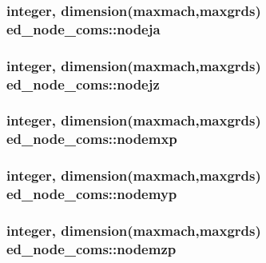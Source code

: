 \subsubsection[{\texorpdfstring{nodeja}{nodeja}}]{\setlength{\rightskip}{0pt plus 5cm}integer, dimension(maxmach,maxgrds) ed\+\_\+node\+\_\+coms\+::nodeja}\hypertarget{namespaceed__node__coms_a116c403afd361d69151547dc435f4fbb}{}\label{namespaceed__node__coms_a116c403afd361d69151547dc435f4fbb}
\subsubsection[{\texorpdfstring{nodejz}{nodejz}}]{\setlength{\rightskip}{0pt plus 5cm}integer, dimension(maxmach,maxgrds) ed\+\_\+node\+\_\+coms\+::nodejz}\hypertarget{namespaceed__node__coms_ae1f44d8dd2031c7740623b475928d5f2}{}\label{namespaceed__node__coms_ae1f44d8dd2031c7740623b475928d5f2}
\subsubsection[{\texorpdfstring{nodemxp}{nodemxp}}]{\setlength{\rightskip}{0pt plus 5cm}integer, dimension(maxmach,maxgrds) ed\+\_\+node\+\_\+coms\+::nodemxp}\hypertarget{namespaceed__node__coms_a5fdf4fa217cc15fdab945bf67190a545}{}\label{namespaceed__node__coms_a5fdf4fa217cc15fdab945bf67190a545}
\subsubsection[{\texorpdfstring{nodemyp}{nodemyp}}]{\setlength{\rightskip}{0pt plus 5cm}integer, dimension(maxmach,maxgrds) ed\+\_\+node\+\_\+coms\+::nodemyp}\hypertarget{namespaceed__node__coms_ad31a7ed8c12f8db5df56c78b9682dc23}{}\label{namespaceed__node__coms_ad31a7ed8c12f8db5df56c78b9682dc23}
\subsubsection[{\texorpdfstring{nodemzp}{nodemzp}}]{\setlength{\rightskip}{0pt plus 5cm}integer, dimension(maxmach,maxgrds) ed\+\_\+node\+\_\+coms\+::nodemzp}\hypertarget{namespaceed__node__coms_aa2430afe20235a8503a91fe9824f1d6b}{}\label{namespaceed__node__coms_aa2430afe20235a8503a91fe9824f1d6b}
